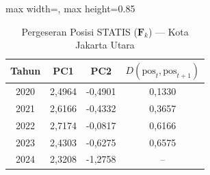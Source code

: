 \begin{table}[H]
\centering
\caption{Pergeseran Posisi STATIS ($\mathbf{F}_k$) --- Kota Jakarta Utara} \label{tab:app1jarak_statis_skor_kota_jakarta_utara}
\begin{adjustbox}{max width=\textwidth, max height=0.85\textheight}
\begin{tabular}{|c|c|c|c|}
\hline
\textbf{Tahun} & \textbf{PC1} & \textbf{PC2} & \textbf{$D(\text{pos}_t, \text{pos}_{t+1})$} \\
\hline
2020 & 2,4964 & -0,4901 & 0,1330 \\
2021 & 2,6166 & -0,4332 & 0,3657 \\
2022 & 2,7174 & -0,0817 & 0,6166 \\
2023 & 2,4303 & -0,6275 & 0,6575 \\
2024 & 2,3208 & -1,2758 & -- \\
\hline
\end{tabular}
\end{adjustbox}
\end{table}